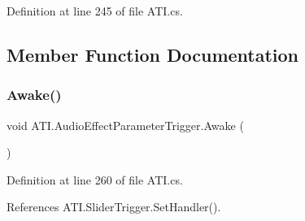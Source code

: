 Definition at line 245 of file A\+T\+I.\+cs.



\subsection{Member Function Documentation}
\mbox{\label{class_a_t_i_1_1_audio_effect_parameter_trigger_ae980fd38eb2207caaa9049f2f47b982a}} 
\subsubsection{\texorpdfstring{Awake()}{Awake()}}
{\footnotesize\ttfamily void A\+T\+I.\+Audio\+Effect\+Parameter\+Trigger.\+Awake (\begin{DoxyParamCaption}{ }\end{DoxyParamCaption})\hspace{0.3cm}{\ttfamily [private]}}



Definition at line 260 of file A\+T\+I.\+cs.



References A\+T\+I.\+Slider\+Trigger.\+Set\+Handler().


